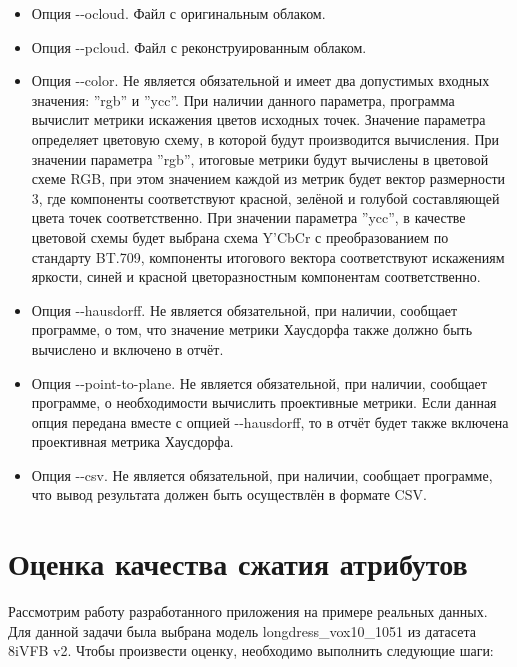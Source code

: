 \begin{itemize}
    \item Опция -{}-ocloud. Файл с оригинальным облаком.
    \item Опция -{}-pcloud. Файл с реконструированным облаком.
    \item Опция -{}-color. Не является обязательной и имеет два допустимых входных
    значения: ''rgb'' и ''ycc''. При наличии данного параметра, программа
    вычислит метрики искажения цветов исходных точек. Значение параметра
    определяет цветовую схему, в которой будут производится вычисления. При
    значении параметра ''rgb'', итоговые метрики будут вычислены в цветовой
    схеме RGB, при этом значением каждой из метрик будет вектор размерности 3,
    где компоненты соответствуют красной, зелёной и голубой составляющей цвета
    точек соответственно. При значении параметра ''ycc'', в качестве цветовой
    схемы будет выбрана схема Y'CbCr с преобразованием по стандарту BT.709,
    компоненты итогового вектора соответствуют искажениям яркости, синей и
    красной цветоразностным компонентам соответственно.
    \item Опция -{}-hausdorff. Не является обязательной, при наличии, сообщает
    программе, о том, что значение метрики Хаусдорфа также должно быть вычислено
    и включено в отчёт.
    \item Опция -{}-point-to-plane. Не является обязательной, при наличии,
    сообщает программе, о необходимости вычислить проективные метрики. Если
    данная опция передана вместе с опцией -{}-hausdorff, то в отчёт будет также
    включена проективная метрика Хаусдорфа.
    \item Опция -{}-csv. Не является обязательной, при наличии, сообщает
    программе, что вывод результата должен быть осуществлён в формате CSV.
\end{itemize}


\section{Оценка качества сжатия атрибутов}

Рассмотрим работу разработанного приложения на примере реальных данных. Для
данной задачи была выбрана модель longdress\_vox10\_1051 из датасета 8iVFB
v2\cite{LongdressDataset}. Чтобы произвести оценку, необходимо выполнить
следующие шаги:

